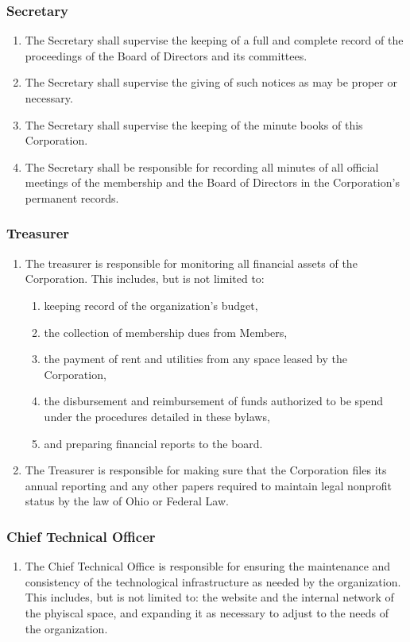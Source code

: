 \documentclass{article}
\begin{document}
  \subsubsection{Secretary}
    \begin{enumerate}
      \item The Secretary shall supervise the keeping of a full and complete record of the
      proceedings of the Board of Directors and its committees.
      \item The Secretary shall supervise the giving of such notices as may be proper or
      necessary.
      \item The Secretary shall supervise the keeping of the minute books of this Corporation.
      \item The Secretary shall be responsible for recording all minutes of all official meetings of
    the membership and the Board of Directors in the Corporation's permanent records.
    \end{enumerate}
  \subsubsection{Treasurer}
    \begin{enumerate}
      \item The treasurer is responsible for monitoring all financial assets of the Corporation.
      This includes, but is not limited to:
      \begin{enumerate}
        \item keeping record of the organization's budget,
        \item the collection of membership dues from Members,
        \item the payment of rent and utilities from any space leased by the Corporation,
        \item the disbursement and reimbursement of funds authorized to be spend under the
        procedures detailed in these bylaws,
        \item and preparing financial reports to the board.
      \end{enumerate}
      \item The Treasurer is responsible for making sure that the Corporation files its annual
      reporting and any other papers required to maintain legal nonprofit status by the law of
      Ohio or Federal Law.
    \end{enumerate}
  \subsubsection{Chief Technical Officer}
    \begin{enumerate}
      \item The Chief Technical Office is responsible for ensuring the maintenance and
      consistency of the technological infrastructure as needed by the organization.  This
      includes, but is not limited to: the website and the internal network of the
      phyiscal space, and expanding it as necessary to adjust to the needs of the organization.
    \end{enumerate}
\end{document}
